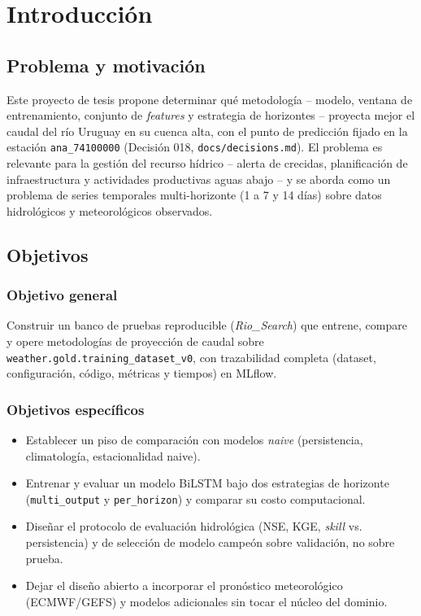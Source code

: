 \chapter{Introducci\'on}

\section{Problema y motivaci\'on}

Este proyecto de tesis propone determinar qu\'e metodolog\'ia -- modelo, ventana de entrenamiento,
conjunto de \emph{features} y estrategia de horizontes -- proyecta mejor el caudal del r\'io
Uruguay en su cuenca alta, con el punto de predicci\'on fijado en la estaci\'on
\texttt{ana\_74100000} (Decisi\'on 018, \texttt{docs/decisions.md}). El problema es relevante para
la gesti\'on del recurso h\'idrico -- alerta de crecidas, planificaci\'on de infraestructura y
actividades productivas aguas abajo -- y se aborda como un problema de series temporales
multi-horizonte (1 a 7 y 14 d\'ias) sobre datos hidrol\'ogicos y meteorol\'ogicos observados.

\section{Objetivos}

\subsection{Objetivo general}

Construir un banco de pruebas reproducible (\emph{Rio\_Search}) que entrene, compare y opere
metodolog\'ias de proyecci\'on de caudal sobre \texttt{weather.gold.training\_dataset\_v0}, con
trazabilidad completa (dataset, configuraci\'on, c\'odigo, m\'etricas y tiempos) en MLflow.

\subsection{Objetivos espec\'ificos}

\begin{itemize}[noitemsep]
  \item Establecer un piso de comparaci\'on con modelos \emph{naive} (persistencia, climatolog\'ia,
    estacionalidad naive).
  \item Entrenar y evaluar un modelo BiLSTM bajo dos estrategias de horizonte
    (\texttt{multi\_output} y \texttt{per\_horizon}) y comparar su costo computacional.
  \item Dise\~nar el protocolo de evaluaci\'on hidrol\'ogica (NSE, KGE, \emph{skill} vs.
    persistencia) y de selecci\'on de modelo campe\'on sobre validaci\'on, no sobre prueba.
  \item Dejar el dise\~no abierto a incorporar el pron\'ostico meteorol\'ogico (ECMWF/GEFS) y
    modelos adicionales sin tocar el n\'ucleo del dominio.
\end{itemize}

